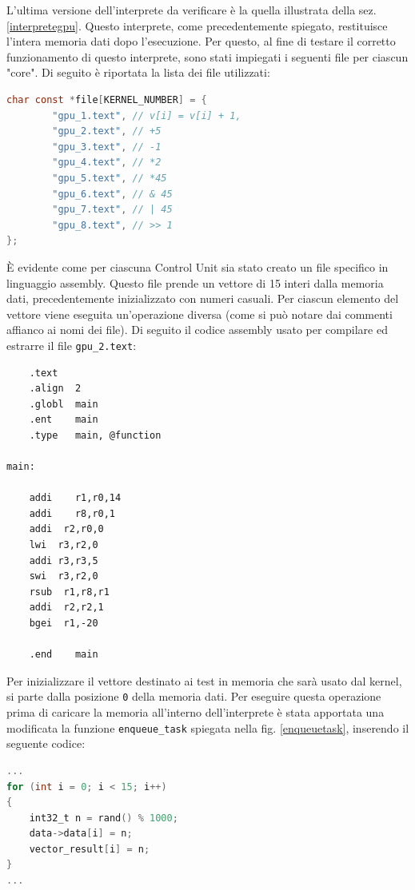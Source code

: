 \vspace{0.3cm}

L'ultima versione dell'interprete da verificare è la quella illustrata della sez. \ref{interpretegpu}. Questo interprete, come precedentemente spiegato, restituisce l'intera memoria dati dopo l'esecuzione. Per questo, al fine di testare il corretto funzionamento di questo interprete, sono stati impiegati i seguenti file per ciascun "core". Di seguito è riportata la lista dei file utilizzati:  

\begin{lstlisting}[language=C]
char const *file[KERNEL_NUMBER] = {
		"gpu_1.text", // v[i] = v[i] + 1,
		"gpu_2.text", // +5
		"gpu_3.text", // -1
		"gpu_4.text", // *2
		"gpu_5.text", // *45
		"gpu_6.text", // & 45
		"gpu_7.text", // | 45
		"gpu_8.text", // >> 1
};
\end{lstlisting}

\vspace{0.3cm}
È evidente come per ciascuna Control Unit sia stato creato un file specifico in linguaggio assembly. Questo file prende un vettore di 15 interi dalla memoria dati, precedentemente inizializzato con numeri casuali. Per ciascun  elemento del vettore viene eseguita un'operazione diversa (come si può notare dai commenti affianco ai nomi dei file). Di seguito il codice assembly usato per compilare ed estrarre il file \texttt{gpu\_2.text}:

\begin{lstlisting}
	.text
	.align	2
	.globl	main
	.ent	main
	.type	main, @function      

main:

	addi	r1,r0,14
	addi	r8,r0,1 
	addi  r2,r0,0
	lwi	 r3,r2,0	
	addi r3,r3,5
	swi  r3,r2,0   
	rsub  r1,r8,r1
	addi  r2,r2,1
	bgei  r1,-20

	.end	main
\end{lstlisting}

Per inizializzare il vettore destinato ai test in memoria che sarà usato dal kernel, si parte dalla posizione \texttt{0} della memoria dati. Per eseguire questa operazione prima di caricare la memoria all'interno dell'interprete è stata apportata una modificata la funzione \texttt{enqueue\_task} spiegata nella fig. \ref{enqueuetask}, inserendo il seguente codice:

\begin{lstlisting}[language=C]
...
for (int i = 0; i < 15; i++)
{
	int32_t n = rand() % 1000;
	data->data[i] = n;
	vector_result[i] = n;
}
...
\end{lstlisting}

